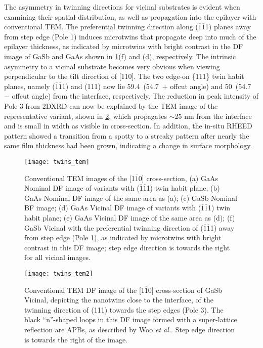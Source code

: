 The asymmetry in twinning directions for vicinal substrates is evident when examining their spatial distribution, as well as propagation into the epilayer with conventional TEM. The preferential twinning direction along ($\overline{1}\overline{1}$1) planes away from step edge (Pole 1) induces microtwins that propagate deep into much of the epilayer thickness, as indicated by microtwins with bright contrast in the DF image of GaSb and GaAs shown in \cref{fig:twins_tem}(f) and (d), respectively. The intrinsic asymmetry to a vicinal substrate becomes very obvious when viewing perpendicular to the tilt direction of [110]. The two edge-on \{111\} twin habit planes, namely ($\overline{1}\overline{1}$1) and (111) now lie 59.4\degree~(54.7\degree~$+$ offcut angle) and 50\degree~(54.7\degree~$-$ offcut angle) from the interface, respectively. The reduction in peak intensity of Pole 3 from 2DXRD can now be explained by the TEM image of the representative variant, shown in \cref{fig:twins_tem2}, which propagates $\sim$25 nm from the interface and is small in width as visible in cross-section. In addition, the in-situ RHEED pattern showed a transition from a spotty to a streaky pattern after nearly the same film thickness had been grown, indicating a change in surface morphology.
\begin{figure}
    \centering
    \texttt{[image: twins\_tem]}
    \caption[TEM images of III-V on silicon]{\label{fig:twins_tem}Conventional TEM images of the [1$\overline{1}$0] cross-section, (a) GaAs Nominal DF image of variants with ($\overline{1}\overline{1}$1) twin habit plane; (b) GaAs Nominal DF image of the same area as (a); (c) GaSb Nominal BF image; (d) GaAs Vicinal DF image of variants with ($\overline{1}\overline{1}$1) twin habit plane; (e) GaAs Vicinal DF image of the same area as (d); (f) GaSb Vicinal with the preferential twinning direction of ($\overline{1}\overline{1}$1) away from step edge (Pole 1), as indicated by microtwins with bright contrast in this DF image; step edge direction is towards the right for all vicinal images.}
\end{figure}
\begin{figure}
    \centering
    \texttt{[image: twins\_tem2]}
    \caption[TEM of GaSb on silicon]{\label{fig:twins_tem2}Conventional TEM DF image of the [1$\overline{1}$0] cross-section of GaSb Vicinal, depicting the nanotwins close to the interface, of the twinning direction of (111) towards the step edges (Pole 3). The black ``n''-shaped loops in this DF image formed with a super-lattice reflection are APBs, as described by Woo \textit{et al.}\cite{Woo}. Step edge direction is towards the right of the image.}
\end{figure}
